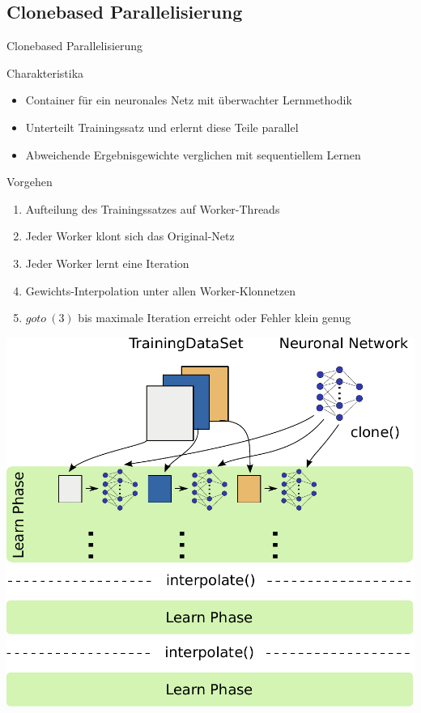 \documentclass[18pt]{beamer}
\begin{document}
	\subsection{Clonebased Parallelisierung}
	\begin{frame}[allowframebreaks]{Clonebased Parallelisierung}
		\begin{block}{Charakteristika}
			\begin{itemize}
				\item Container für ein neuronales Netz mit überwachter Lernmethodik
				\item Unterteilt Trainingssatz und erlernt diese Teile parallel
				\item Abweichende Ergebnisgewichte verglichen mit sequentiellem Lernen
			\end{itemize}
		\end{block}
	
	\framebreak
		\begin{block}{Vorgehen}
			\begin{enumerate}
				\item Aufteilung des Trainingssatzes auf Worker-Threads
				\item Jeder Worker klont sich das Original-Netz
				\item Jeder Worker lernt eine Iteration
				\item Gewichts-Interpolation unter allen Worker-Klonnetzen
				\item $goto\ (3)$ bis maximale Iteration erreicht oder Fehler klein genug
			\end{enumerate}
		\end{block}
	
	\framebreak
		\begin{center}
			\includegraphics[width=.65\textwidth]{images/Parallelisierungsansatz.pdf} 
		\end{center}
	

\end{frame}
\end{document}
